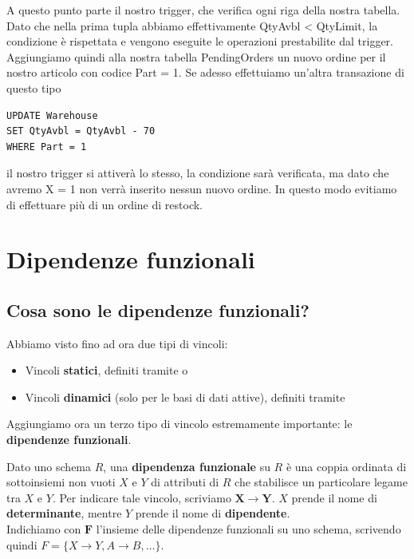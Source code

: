 \documentclass[11pt, a4paper, titlepage, oneside]{scrbook}
\begin{document}
A questo punto parte il nostro trigger, che verifica ogni riga della nostra tabella. Dato che nella prima tupla abbiamo effettivamente QtyAvbl < QtyLimit, la condizione è rispettata e vengono eseguite le operazioni prestabilite dal trigger. Aggiungiamo quindi alla nostra tabella PendingOrders un nuovo ordine per il nostro articolo con codice Part = 1. Se adesso effettuiamo un'altra transazione di questo tipo
\begin{lstlisting}
UPDATE Warehouse
SET QtyAvbl = QtyAvbl - 70
WHERE Part = 1
\end{lstlisting}

il nostro trigger si attiverà lo stesso, la condizione sarà verificata, ma dato che avremo X = 1 non verrà inserito nessun nuovo ordine. In questo modo evitiamo di effettuare più di un ordine di restock.

\chapter{Dipendenze funzionali}

\section{Cosa sono le dipendenze funzionali?}

Abbiamo visto fino ad ora due tipi di vincoli:
\begin{itemize}
    \item Vincoli \textbf{statici}, definiti tramite  o 
    \item Vincoli \textbf{dinamici} (solo per le basi di dati attive), definiti tramite 
\end{itemize}

Aggiungiamo ora un terzo tipo di vincolo estremamente importante: le \textbf{dipendenze funzionali}.

\begin{Definizione}
\label{def-dipendenze-funzionali}
Dato uno schema $R$, una \textbf{dipendenza funzionale} su $R$ è una coppia ordinata di sottoinsiemi non vuoti $X$ e $Y$ di attributi di $R$ che stabilisce un particolare legame tra $X$ e $Y$. Per indicare tale vincolo, scriviamo $\bm{X} \longrightarrow \bm{Y}$. $X$ prende il nome di \textbf{determinante}, mentre $Y$ prende il nome di \textbf{dipendente}. \\
Indichiamo con $\bm{F}$ l'insieme delle dipendenze funzionali su uno schema, scrivendo quindi $F = \{X \longrightarrow Y, A \longrightarrow B, \ldots\}$.
\end{Definizione}
\end{document}

